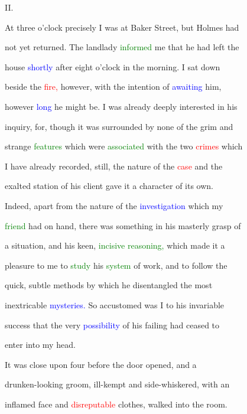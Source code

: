  II.



 At three o'clock precisely I was at Baker Street, but Holmes had

 not yet returned. The landlady \textcolor{green}{informed} me that he had left the

 house \textcolor{blue}{shortly} after eight o'clock in the morning. I sat down

 beside the \textcolor{red}{fire,} however, with the intention of \textcolor{blue}{awaiting} him,

 however \textcolor{blue}{long} he might be. I was already deeply \textcolor{BurntOrange}{interested} in his

 \textcolor{BurntOrange}{inquiry,} for, though it was \textcolor{BurntOrange}{surrounded} by none of the \textcolor{BurntOrange}{grim} and

 strange \textcolor{green}{features} which were \textcolor{green}{associated} with the two \textcolor{red}{crimes} which

 I have already recorded, still, the nature of the \textcolor{red}{case} and the

 \textcolor{BurntOrange}{exalted} station of his client gave it a character of its own.

 Indeed, apart from the nature of the \textcolor{blue}{investigation} which my

 \textcolor{green}{friend} had on hand, there was something in his masterly grasp of

 a situation, and his keen, \textcolor{green}{incisive} \textcolor{green}{reasoning,} which made it a

 pleasure to me to \textcolor{green}{study} his \textcolor{green}{system} of work, and to follow the

 quick, subtle methods by which he disentangled the most

 inextricable \textcolor{blue}{mysteries.} So accustomed was I to his invariable

 \textcolor{BurntOrange}{success} that the very \textcolor{blue}{possibility} of his failing had ceased to

 enter into my head.



 It was close upon four before the door opened, and a

 drunken-looking groom, ill-kempt and side-whiskered, with an

 inflamed face and \textcolor{red}{disreputable} clothes, walked into the room.

